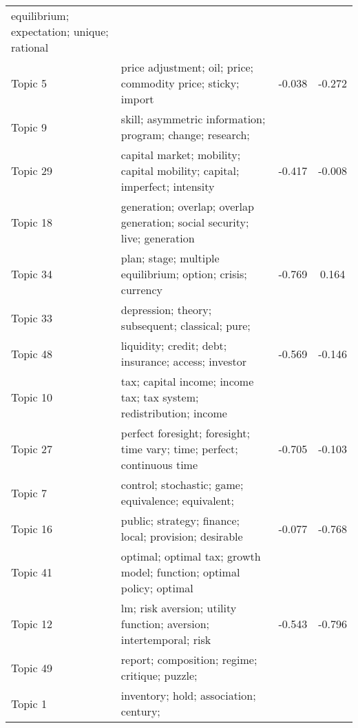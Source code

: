 \documentclass[
  12pt,
  onecolumn]{article}
\begin{document}
\begin{longtable}[t]{l>{\raggedright\arraybackslash}m{25em}cc}
equilibrium;
expectation;
unique;
rational
\cellcolor{gray!6}{expectation} & \cellcolor{gray!6}{0.042} & \cellcolor{gray!6}{-0.339}\\
Topic 5 & price
adjustment;
oil;
price;
commodity
price;
sticky;
import & -0.038 & -0.272\\
Topic 9 & skill;
asymmetric
information;
program;
change;
research;
\cellcolor{gray!6}{complementarity} & \cellcolor{gray!6}{-0.012} & \cellcolor{gray!6}{-0.321}\\
Topic 29 & capital
market;
mobility;
capital
mobility;
capital;
imperfect;
intensity & -0.417 & -0.008\\
Topic 18 & generation;
overlap;
overlap
generation;
social
security;
live;
generation
\cellcolor{gray!6}{model} & \cellcolor{gray!6}{-0.294} & \cellcolor{gray!6}{-0.308}\\
\addlinespace
Topic 34 & plan;
stage;
multiple
equilibrium;
option;
crisis;
currency & -0.769 & 0.164\\
Topic 33 & depression;
theory;
subsequent;
classical;
pure;
\cellcolor{gray!6}{principle} & \cellcolor{gray!6}{0.024} & \cellcolor{gray!6}{-0.688}\\
Topic 48 & liquidity;
credit;
debt;
insurance;
access;
investor & -0.569 & -0.146\\
Topic 10 & tax;
capital
income;
income
tax;
tax
system;
redistribution;
income
\cellcolor{gray!6}{taxation} & \cellcolor{gray!6}{-0.153} & \cellcolor{gray!6}{-0.646}\\
Topic 27 & perfect
foresight;
foresight;
time
vary;
time;
perfect;
continuous
time & -0.705 & -0.103\\
\addlinespace
Topic 7 & control;
stochastic;
game;
equivalence;
equivalent;
\cellcolor{gray!6}{solution} & \cellcolor{gray!6}{-0.203} & \cellcolor{gray!6}{-0.609}\\
Topic 16 & public;
strategy;
finance;
local;
provision;
desirable & -0.077 & -0.768\\
Topic 41 & optimal;
optimal
tax;
growth
model;
function;
optimal
policy;
optimal
\cellcolor{gray!6}{taxation} & \cellcolor{gray!6}{0.042} & \cellcolor{gray!6}{-1.067}\\
Topic 12 & lm;
risk
aversion;
utility
function;
aversion;
intertemporal;
risk & -0.543 & -0.796\\
Topic 49 & report;
composition;
regime;
critique;
puzzle;
\cellcolor{gray!6}{profit} & \cellcolor{gray!6}{-0.294} & \cellcolor{gray!6}{-1.132}\\
\addlinespace
Topic 1 & inventory;
hold;
association;
century;

\end{longtable}
\end{document}
